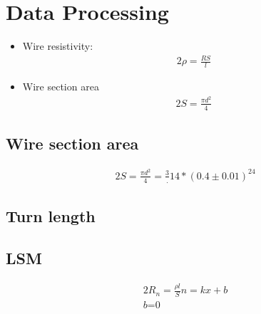 \documentclass{article}%
\begin{document}
%
\normalsize%
\section{\textbf{Data Processing}}%
\label{sec:textbfDataProcessing}%
\begin{itemize}%
\item%
Wire resistivity: %
\begin{alignat*}{2}%
\rho =\frac{RS}{l}%
\end{alignat*}%
\item%
Wire section area%
\begin{alignat*}{2}%
S=\frac{\pi d^2}{4}%
\end{alignat*}%
\end{itemize}%
\subsection{\textbf{Wire section area}}%
\label{subsec:textbfWiresectionarea}%
\begin{alignat*}{2}%
S=\frac{\pi d^2}{4}=%
\frac3.14 * (0.4 ± 0.01)^24%
\end{alignat*}

%
\subsection{\textbf{Turn length}}%
\label{subsec:textbfTurnlength}%

%
\subsection{\textbf{LSM}}%
\label{subsec:textbfLSM}%
\begin{alignat*}{2}%
{R_n}=\frac{\rho l}{S} n=k x + b\\%
\textit{b=0}%
\end{alignat*}

%
\end{document}
